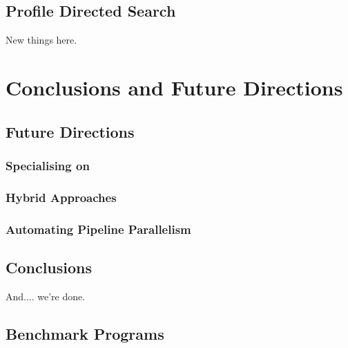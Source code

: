 \documentclass[dottedtoc, headinclude, footinclude=true, a4paper]{scrreprt}
\begin{document}
\chapter{Profile Directed Search}

    New things here.
    \label{sec:informed-search}
    


\part{Conclusions and Future Directions}
\chapter{Future Directions}
    

    \section{Specialising on \underline{\hspace{2cm}}}
    

    \section{Hybrid Approaches}
    

    \section{Automating Pipeline Parallelism}


\chapter{Conclusions}

    And.... we're done.


\begin{appendices}

\chapter{Benchmark Programs}


\end{appendices}

\listoftodos[Notes]

\if@openright
  \cleardoublepage
\else
  \clearpage
\fi



\end{document}
